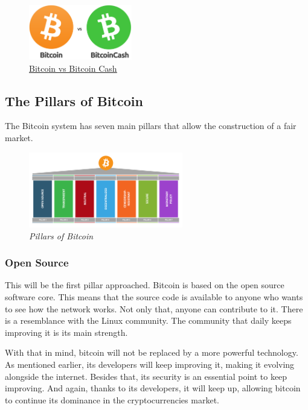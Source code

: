 \documentclass{article}
\newcommand\tab[1][1cm]{\hspace*{#1}}
\begin{document}
\begin{figure}[H]
    \begin{center}
        \includegraphics[width=0.4\textwidth]{images/bitcoin_vs_bitcoin_cash.png}
        \caption{\href{https://cdn-images-1.medium.com/max/719/1*kW1BN8Zq8YGR1YYYK2kv9g.png}{\underline{Bitcoin vs Bitcoin Cash}}}
    \end{center}
\end{figure}

\subsection{The Pillars of Bitcoin}

\tab The Bitcoin system has seven main pillars that allow the construction of a fair market. 

\begin{figure}[H]
    \begin{center}
        \includegraphics[width=0.6\textwidth]{images/pillars.png}
        \caption{\textit{Pillars of Bitcoin}}
    \end{center}
\end{figure}

\subsubsection{Open Source}

\tab This will be the first pillar approached. Bitcoin is based on the open source software core. This means that the source code is available to anyone who wants to see how the network works. Not only that, anyone can contribute to it. There is a resemblance with the Linux community. The community that daily keeps improving it is its main strength.

With that in mind, bitcoin will not be replaced by a more powerful technology. As mentioned earlier, its developers will keep improving it, making it evolving alongside the internet. Besides that, its security is an essential point to keep improving. And again, thanks to its developers, it will keep up, allowing bitcoin to continue its dominance in the cryptocurrencies market.
\end{document}
